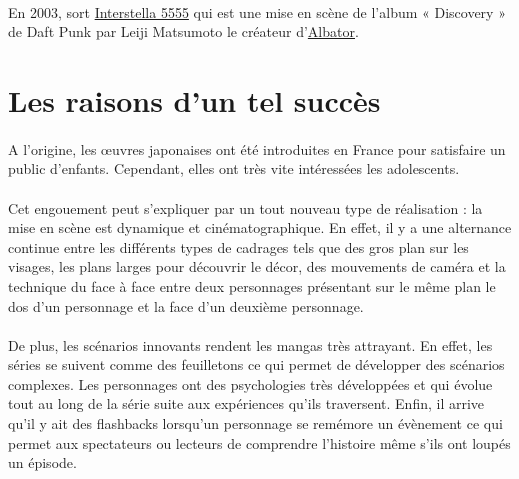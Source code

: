 \paragraph{}
En 2003, sort \underline{Interstella 5555} qui est une mise en scène de l’album « Discovery » de Daft Punk par Leiji Matsumoto le créateur d’\underline{Albator}.

\section{Les raisons d'un tel succès}
\paragraph{}
A l’origine, les œuvres japonaises ont été introduites en France pour satisfaire un public d’enfants. Cependant, elles ont très vite intéressées les adolescents. 
\paragraph{}
Cet engouement peut s’expliquer par un tout nouveau type de réalisation : la mise en scène est dynamique et cinématographique. En effet, il y a une alternance continue entre les différents types de cadrages tels que des gros plan sur les visages, les plans larges pour découvrir le décor, des mouvements de caméra et la technique du face à face entre deux personnages présentant sur le même plan le dos d’un personnage et la face d’un deuxième personnage. 
\paragraph{}
De plus, les scénarios innovants rendent les mangas très attrayant. En effet, les séries se suivent comme des feuilletons ce qui permet de développer des scénarios complexes. Les personnages ont des psychologies très développées et qui évolue tout au long de la série suite aux expériences qu’ils traversent. Enfin, il arrive qu’il y ait des flashbacks lorsqu’un personnage se remémore un évènement ce qui permet aux spectateurs ou lecteurs de comprendre l’histoire même s’ils ont loupés un épisode. 
